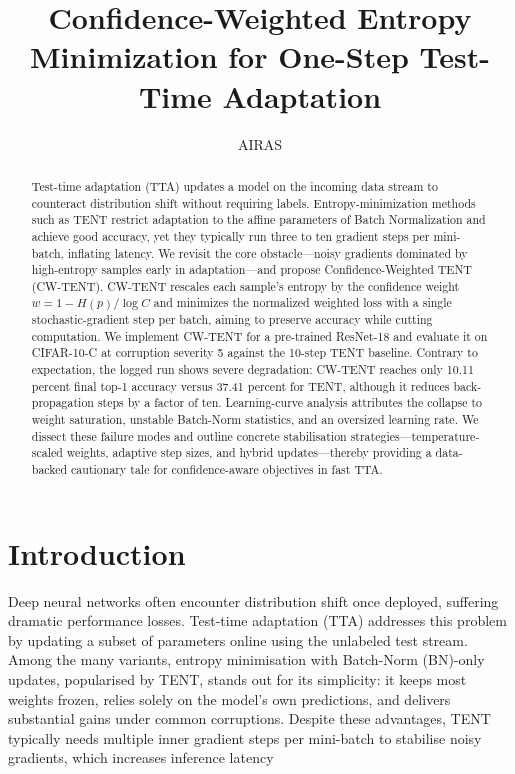 \documentclass{article} %
\title{Confidence-Weighted Entropy Minimization for One-Step Test-Time Adaptation}
\author{AIRAS}
\begin{document}
\maketitle

\begin{abstract}
Test-time adaptation (TTA) updates a model on the incoming data stream to counteract distribution shift without requiring labels. Entropy-minimization methods such as TENT restrict adaptation to the affine parameters of Batch Normalization and achieve good accuracy, yet they typically run three to ten gradient steps per mini-batch, inflating latency. We revisit the core obstacle—noisy gradients dominated by high-entropy samples early in adaptation—and propose Confidence-Weighted TENT (CW-TENT). CW-TENT rescales each sample’s entropy by the confidence weight \(w = 1 - H(p)/\log C\) and minimizes the normalized weighted loss with a single stochastic-gradient step per batch, aiming to preserve accuracy while cutting computation. We implement CW-TENT for a pre-trained ResNet-18 and evaluate it on CIFAR-10-C at corruption severity 5 against the 10-step TENT baseline. Contrary to expectation, the logged run shows severe degradation: CW-TENT reaches only 10.11 percent final top-1 accuracy versus 37.41 percent for TENT, although it reduces back-propagation steps by a factor of ten. Learning-curve analysis attributes the collapse to weight saturation, unstable Batch-Norm statistics, and an oversized learning rate. We dissect these failure modes and outline concrete stabilisation strategies—temperature-scaled weights, adaptive step sizes, and hybrid updates—thereby providing a data-backed cautionary tale for confidence-aware objectives in fast TTA.
\end{abstract}

\section{Introduction}
\label{sec:intro}
Deep neural networks often encounter distribution shift once deployed, suffering dramatic performance losses. Test-time adaptation (TTA) addresses this problem by updating a subset of parameters online using the unlabeled test stream. Among the many variants, entropy minimisation with Batch-Norm (BN)-only updates, popularised by TENT, stands out for its simplicity: it keeps most weights frozen, relies solely on the model’s own predictions, and delivers substantial gains under common corruptions. Despite these advantages, TENT typically needs multiple inner gradient steps per mini-batch to stabilise noisy gradients, which increases inference latency
\end{document}
